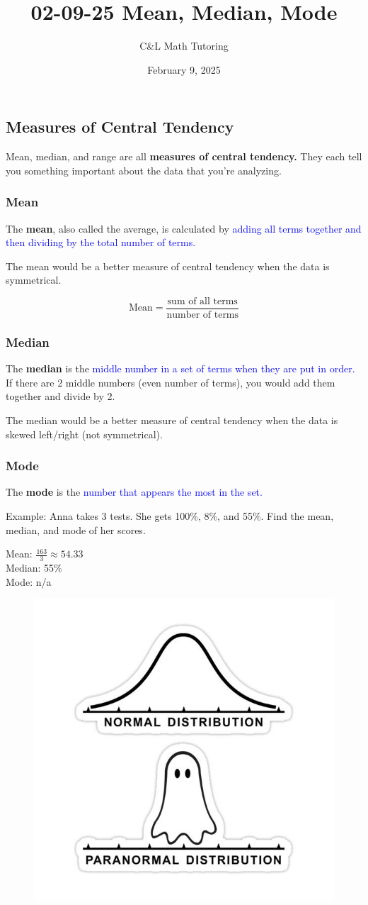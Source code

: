 \documentclass[a4paper, 12pt]{article}
\title{02-09-25 Mean, Median, Mode}
\author{C\&L Math Tutoring}
\date{February 9, 2025}
\begin{document}
\maketitle

\subsection*{Measures of Central Tendency}
Mean, median, and range are all \textbf{measures of central tendency.} They each tell you something important about the data that you're analyzing.

\subsubsection*{Mean}
The \textbf{mean}, also called the average, is calculated by \textcolor{blue}{adding all terms together and then dividing by the total number of terms.}

The mean would be a better measure of central tendency when the data is symmetrical.

$$\text{Mean} = \frac{\text{sum of all terms}}{\text{number of terms}}$$

\subsubsection*{Median}
The \textbf{median} is the \textcolor{blue}{middle number in a set of terms when they are put in order.} If there are 2 middle numbers (even number of terms), you would add them together and divide by 2.

The median would be a better measure of central tendency when the data is skewed left/right (not symmetrical).

\subsubsection*{Mode}
The \textbf{mode} is the \textcolor{blue}{number that appears the most in the set.}

Example: Anna takes 3 tests. She gets 100\%, 8\%, and 55\%. Find the mean, median, and mode of her scores.

Mean: $\frac{163}{3} \approx 54.33 $\\
Median: 55\% \\
Mode: n/a

\begin{figure}[H]
    \centering
    \includegraphics[width=0.5\linewidth]{meme.jpg}
    \label{fig:enter-label}
\end{figure}
\end{document}
